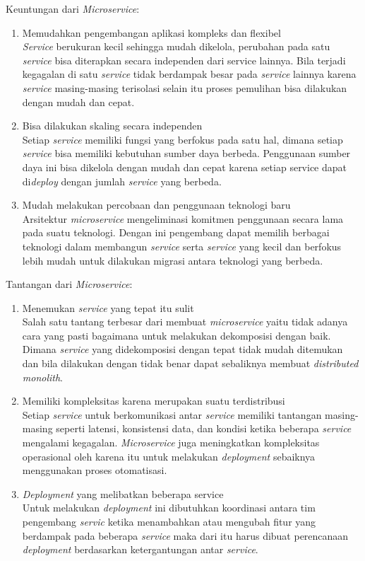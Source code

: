 Keuntungan dari \textit{Microservice}:
\begin{enumerate}[leftmargin=1.3cm]
	\item Memudahkan pengembangan aplikasi kompleks dan flexibel\\
	\textit{Service} berukuran kecil sehingga mudah dikelola, perubahan pada satu \textit{service} bisa diterapkan secara independen dari service lainnya. Bila terjadi kegagalan di satu \textit{service} tidak berdampak besar pada \textit{service} lainnya karena \textit{service} masing-masing terisolasi selain itu proses pemulihan bisa dilakukan dengan mudah dan cepat.
	\item Bisa dilakukan skaling secara independen\\ 
	Setiap \textit{service} memiliki fungsi yang berfokus pada satu hal,  dimana setiap \textit{service} bisa memiliki kebutuhan sumber daya berbeda. Penggunaan sumber daya ini bisa dikelola dengan mudah dan cepat karena setiap service dapat di\textit{deploy} dengan jumlah \textit{service} yang berbeda.
	\item Mudah melakukan percobaan dan penggunaan teknologi baru\\
	Arsitektur \textit{microservice} mengeliminasi komitmen penggunaan secara lama pada suatu teknologi. Dengan ini pengembang dapat memilih berbagai teknologi dalam membangun \textit{service} serta \textit{service} yang kecil dan berfokus lebih mudah untuk dilakukan migrasi antara teknologi yang berbeda. 
\end{enumerate}	

Tantangan dari \textit{Microservice}:
\begin{enumerate}[leftmargin=1.3cm]
	\item Menemukan \textit{service} yang tepat itu sulit\\
	Salah satu tantang terbesar dari membuat \textit{microservice} yaitu tidak adanya cara yang pasti bagaimana untuk melakukan dekomposisi dengan baik. Dimana \textit{service} yang didekomposisi dengan tepat tidak mudah ditemukan dan bila dilakukan dengan tidak benar dapat sebaliknya membuat \textit{distributed monolith}. 
	\item Memiliki kompleksitas karena merupakan suatu terdistribusi\\
	Setiap \textit{service} untuk berkomunikasi antar \textit{service} memiliki tantangan masing-masing seperti latensi, konsistensi data, dan kondisi ketika beberapa \textit{service} mengalami kegagalan. \textit{Microservice} juga meningkatkan kompleksitas operasional oleh karena itu untuk melakukan \textit{deployment} sebaiknya menggunakan proses otomatisasi.
	\item \textit{Deployment} yang melibatkan beberapa service\\
	Untuk melakukan \textit{deployment} ini dibutuhkan koordinasi antara tim pengembang \textit{servic} ketika menambahkan atau mengubah fitur yang berdampak pada beberapa \textit{service} maka dari itu harus dibuat perencanaan \textit{deployment} berdasarkan ketergantungan antar \textit{service}.
\end{enumerate}	

